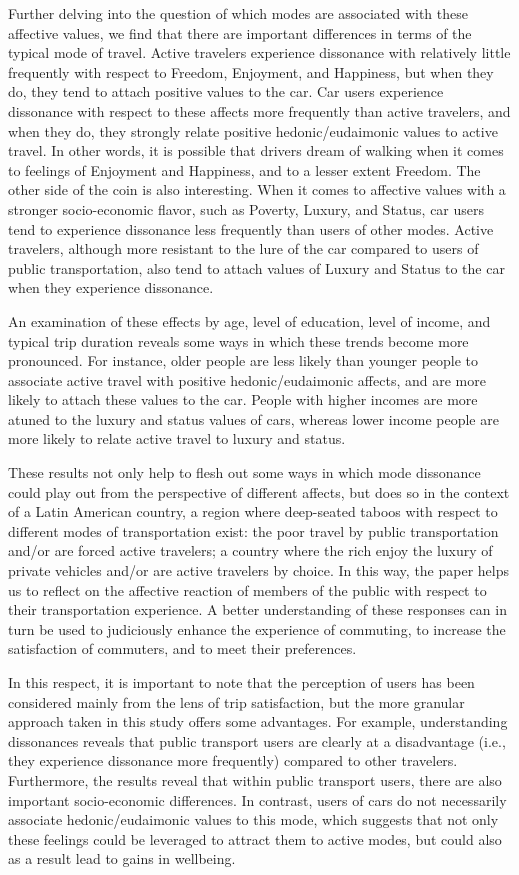 \documentclass[]{elsarticle} %
\begin{document}
Further delving into the question of which modes are associated with
these affective values, we find that there are important differences in
terms of the typical mode of travel. Active travelers experience
dissonance with relatively little frequently with respect to Freedom,
Enjoyment, and Happiness, but when they do, they tend to attach positive
values to the car. Car users experience dissonance with respect to these
affects more frequently than active travelers, and when they do, they
strongly relate positive hedonic/eudaimonic values to active travel. In
other words, it is possible that drivers dream of walking when it comes
to feelings of Enjoyment and Happiness, and to a lesser extent Freedom.
The other side of the coin is also interesting. When it comes to
affective values with a stronger socio-economic flavor, such as Poverty,
Luxury, and Status, car users tend to experience dissonance less
frequently than users of other modes. Active travelers, although more
resistant to the lure of the car compared to users of public
transportation, also tend to attach values of Luxury and Status to the
car when they experience dissonance.

An examination of these effects by age, level of education, level of
income, and typical trip duration reveals some ways in which these
trends become more pronounced. For instance, older people are less
likely than younger people to associate active travel with positive
hedonic/eudaimonic affects, and are more likely to attach these values
to the car. People with higher incomes are more atuned to the luxury and
status values of cars, whereas lower income people are more likely to
relate active travel to luxury and status.

These results not only help to flesh out some ways in which mode
dissonance could play out from the perspective of different affects, but
does so in the context of a Latin American country, a region where
deep-seated taboos with respect to different modes of transportation
exist: the poor travel by public transportation and/or are forced active
travelers; a country where the rich enjoy the luxury of private vehicles
and/or are active travelers by choice. In this way, the paper helps us
to reflect on the affective reaction of members of the public with
respect to their transportation experience. A better understanding of
these responses can in turn be used to judiciously enhance the
experience of commuting, to increase the satisfaction of commuters, and
to meet their preferences.

In this respect, it is important to note that the perception of users
has been considered mainly from the lens of trip satisfaction, but the
more granular approach taken in this study offers some advantages. For
example, understanding dissonances reveals that public transport users
are clearly at a disadvantage (i.e., they experience dissonance more
frequently) compared to other travelers. Furthermore, the results reveal
that within public transport users, there are also important
socio-economic differences. In contrast, users of cars do not
necessarily associate hedonic/eudaimonic values to this mode, which
suggests that not only these feelings could be leveraged to attract them
to active modes, but could also as a result lead to gains in wellbeing.
\end{document}
